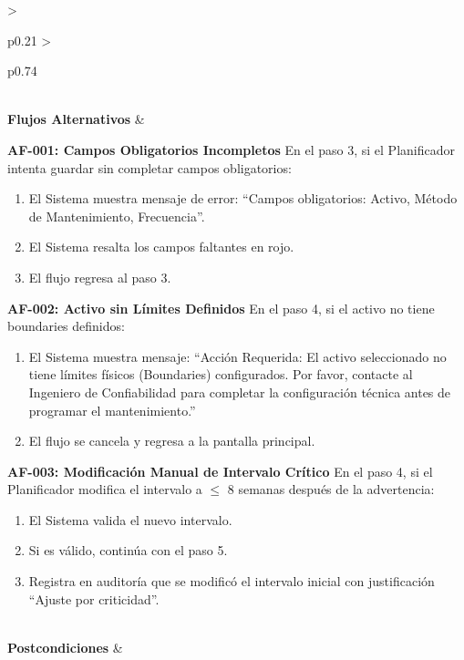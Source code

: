 \begin{longtable}{>{\raggedright\arraybackslash}p{0.21\textwidth} >{\raggedright\arraybackslash}p{0.74\textwidth}}
{\begin{enumerate}[leftmargin=1.5em, nosep, topsep=0pt]
\end{enumerate} \vspace{2pt}} \\
\textbf{Flujos Alternativos} & \parbox[t]{\linewidth}{\vspace{2pt} \vspace{4pt}\noindent\textbf{AF-001: Campos Obligatorios Incompletos}
\newline
En el paso 3, si el Planificador intenta guardar sin completar campos obligatorios:
\begin{enumerate}[leftmargin=1.5em, nosep, topsep=0pt]
\item El Sistema muestra mensaje de error: ``Campos obligatorios: Activo, Método de Mantenimiento, Frecuencia''.
\item El Sistema resalta los campos faltantes en rojo.
\item El flujo regresa al paso 3.
\end{enumerate}
\vspace{4pt}\noindent\textbf{AF-002: Activo sin Límites Definidos}
\newline
En el paso 4, si el activo no tiene boundaries definidos:
\begin{enumerate}[leftmargin=1.5em, nosep, topsep=0pt]
\item El Sistema muestra mensaje: ``Acción Requerida: El activo seleccionado no tiene límites físicos (Boundaries) configurados. Por favor, contacte al Ingeniero de Confiabilidad para completar la configuración técnica antes de programar el mantenimiento.''
\item El flujo se cancela y regresa a la pantalla principal.
\end{enumerate}
\vspace{4pt}\noindent\textbf{AF-003: Modificación Manual de Intervalo Crítico}
\newline
En el paso 4, si el Planificador modifica el intervalo a $\le$ 8 semanas después de la advertencia:
\begin{enumerate}[leftmargin=1.5em, nosep, topsep=0pt]
\item El Sistema valida el nuevo intervalo.
\item Si es válido, continúa con el paso 5.
\item Registra en auditoría que se modificó el intervalo inicial con justificación ``Ajuste por criticidad''.
\end{enumerate} \vspace{2pt}} \\
\textbf{Postcondiciones} & \parbox[t]{\linewidth}{\vspace{2pt} \begin{itemize}[leftmargin=1.5em, nosep, topsep=0pt]

\end{itemize}}
\end{longtable}
